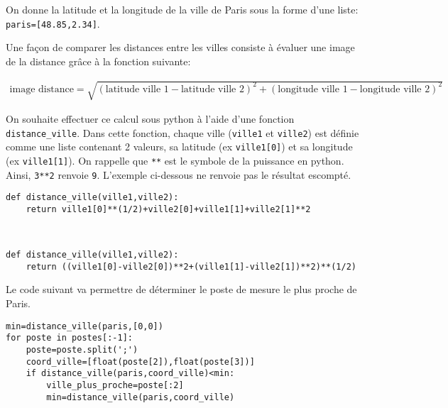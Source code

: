 On donne la latitude et la longitude de la ville de Paris sous la forme d'une liste: \verb?paris=[48.85,2.34]?.

Une façon de comparer les distances entre les villes consiste à évaluer une image de la distance grâce à la fonction suivante:

\begin{eqnarray}
\text{image distance}=\sqrt{(\text{latitude ville 1}-\text{latitude ville 2})^2+(\text{longitude ville 1}-\text{longitude ville 2})^2}\label{eq_dist}
\end{eqnarray}

On souhaite effectuer ce calcul sous python à l'aide d'une fonction \texttt{distance\_ville}. Dans cette fonction, chaque ville (\verb?ville1? et \verb?ville2?) est définie comme une liste contenant 2 valeurs, sa latitude (ex \verb?ville1[0]?) et sa longitude (ex \verb?ville1[1]?). On rappelle que \verb?**? est le symbole de la puissance en python. Ainsi, \verb?3**2? renvoie \verb?9?. L'exemple ci-dessous ne renvoie pas le résultat escompté.

\begin{verbatim}
def distance_ville(ville1,ville2):
    return ville1[0]**(1/2)+ville2[0]+ville1[1]+ville2[1]**2
\end{verbatim}


\begin{solution}~\ \\
\begin{verbatim}
def distance_ville(ville1,ville2):
    return ((ville1[0]-ville2[0])**2+(ville1[1]-ville2[1])**2)**(1/2)
\end{verbatim}
\end{solution}

Le code suivant va permettre de déterminer le poste de mesure le plus proche de Paris.

\begin{verbatim}
min=distance_ville(paris,[0,0])
for poste in postes[:-1]:
    poste=poste.split(';')
    coord_ville=[float(poste[2]),float(poste[3])]
    if distance_ville(paris,coord_ville)<min:
        ville_plus_proche=poste[:2]
        min=distance_ville(paris,coord_ville)
\end{verbatim}



